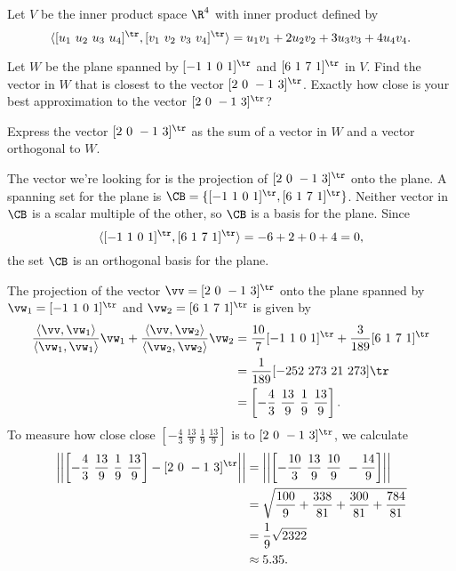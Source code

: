\begin{example}
\ea

\end{example}


\begin{example} Let $V$ be the inner product space $\R^4$ with inner product defined by 
\[\langle [u_1 \ u_2 \ u_3 \ u_4]^{\tr}, [v_1 \ v_2 \ v_3 \ v_4]^{\tr} \rangle = u_1v_1 + 2u_2v_2 + 3u_3v_3 + 4u_4v_4.\]
\ba
\item Let $W$ be the plane spanned by $[-1 \ 1\ 0 \ 1]^{\tr}$ and $[6 \ 1 \ 7 \ 1]^{\tr}$ in $V$. Find the vector in $W$ that is closest to the vector $[2 \ 0 \ -1 \ 3]^{\tr}$. Exactly how close is your best approximation to the vector $[2 \ 0 \ -1 \ 3]^{\tr}$?  

\item Express the vector $[2 \ 0 \ -1 \ 3]^{\tr}$ as the sum of a vector in $W$ and a vector orthogonal to $W$.

\ea

\ExampleSolution 
\ba
\item The vector we're looking for is the projection of $[2 \ 0 \ -1 \ 3]^{\tr}$ onto the plane. A spanning set for the plane is $\CB = \{[-1 \ 1 \ 0 \ 1]^{\tr}, [6 \ 1 \ 7 \ 1]^{\tr}\}$. Neither vector in $\CB$ is a scalar multiple of the other, so $\CB$ is a basis for the plane. Since
\[\langle [-1 \ 1 \ 0 \ 1]^{\tr}, [6 \ 1 \ 7 \ 1]^{\tr} \rangle = -6 + 2 + 0 + 4 =  0,\]
the set $\CB$ is an orthogonal basis for the plane. 

The projection of the vector $\vv = [2 \ 0 \ -1 \ 3]^{\tr}$ onto the plane spanned by $\vw_1 =  [-1 \ 1 \ 0 \ 1]^{\tr}$ and $\vw_2 = [6 \ 1 \ 7 \ 1]^{\tr}$ is given by 
\begin{align*}
\frac{\langle \vv, \vw_1\rangle}{\langle \vw_1, \vw_1\rangle } \vw_1 + \frac{\langle \vv, \vw_2 \rangle }{\langle \vw_2, \vw_2 \rangle}\vw_2 &= \frac{10}{7} [-1 \ 1\ 0 \ 1]^{\tr} + \frac{3}{189}  [6 \ 1 \ 7 \ 1]^{\tr} \\
	&= \frac{1}{189}[-252 \ 273 \ 21 \ 273]{\tr} \\
	&= \left[ -\frac{4}{3} \ \frac{13}{9} \ \frac{1}{9} \ \frac{13}{9} \right].
\end{align*}
To measure how close close $\left[ -\frac{4}{3} \ \frac{13}{9} \ \frac{1}{9} \ \frac{13}{9} \right]$ is to $[2 \ 0 \ -1 \ 3]^{\tr}$, we calculate
\begin{align*}
\left|\left| \left[ -\frac{4}{3} \ \frac{13}{9} \ \frac{1}{9} \ \frac{13}{9} \right]   - [2 \ 0 \ -1 \ 3]^{\tr} \right|\right| &= \left|\left| \left[-\frac{10}{3} \ \frac{13}{9} \ \frac{10}{9} \ -\frac{14}{9} \right] \right| \right| \\
	&= \sqrt{ \frac{100}{9} + \frac{338}{81} + \frac{300}{81} + \frac{784}{81}} \\
	&= \frac{1}{9} \sqrt{2322} \\
	&\approx 5.35.
\end{align*} 


\end{example}
